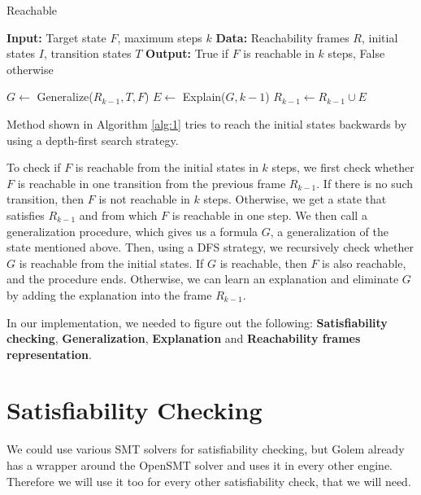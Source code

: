\begin{algorithm}
    \caption{Reachable}\label{alg:1}
\begin{algorithmic}[1]
\State \textbf{Input:} Target state $F$, maximum steps $k$
\State \textbf{Data:} Reachability frames $R$, initial states $I$, transition states $T$
\State \textbf{Output:} True if $F$ is reachable in $k$ steps, False otherwise

    \State {}
\EndIf

        \State $G \gets$ Generalize($R_{k-1}, T, F$)
            \State {}
        \Else
            \State $E \gets$ Explain($G, k-1$)
            \State $R_{k-1} \gets R_{k-1} \cup E$
        \EndIf
    \Else
        \State {}
    \EndIf
\EndWhile

\end{algorithmic}
\end{algorithm}

\noindent Method shown in Algorithm \ref{alg:1} tries to reach the initial states backwards by using a depth-first search strategy.

To check if \( F \) is reachable from the initial states in \( k \) steps, we first check whether \( F \) is reachable in one transition from the previous frame \( R_{k-1} \). If there is no such transition, then \( F \) is not reachable in \( k \) steps. Otherwise, we get a state that satisfies \( R_{k-1} \) and from which \( F \) is reachable in one step. We then call a generalization procedure, which gives us a formula \( G \), a generalization of the state mentioned above. Then, using a DFS strategy, we recursively check whether \( G \) is reachable from the initial states. If \( G \) is reachable, then \( F \) is also reachable, and the procedure ends. Otherwise, we can learn an explanation and eliminate \( G \) by adding the explanation into the frame \( R_{k-1} \).

In our implementation, we needed to figure out the following: \textbf{Satisfiability checking}, \textbf{Generalization}, \textbf{Explanation} and \textbf{Reachability frames representation}.

\section*{Satisfiability Checking}
\noindent We could use various SMT solvers for satisfiability checking, but Golem already has a wrapper around the OpenSMT solver and uses it in every other engine. Therefore we will use it too for every other satisfiability check, that we will need.

